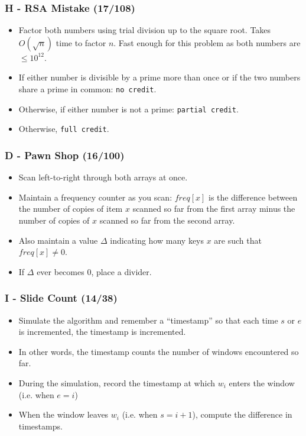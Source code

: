 \documentclass{beamer}
\begin{document}
\begin{frame}
\frametitle{H - RSA Mistake (17/108)}
\begin{itemize}
  \setlength\itemsep{0.5\baselineskip}
\item Factor both numbers using trial division up to the square root. Takes $O(\sqrt n)$ time to factor $n$. Fast enough for this problem as both numbers are $\leq 10^{12}$.
\item If either number is divisible by a prime more than once or if the two numbers share a prime in common: \texttt{no credit}.
\item Otherwise, if either number is not a prime: \texttt{partial credit}.
\item Otherwise, \texttt{full credit}.
\end{itemize}
\end{frame}



\begin{frame}
\frametitle{D - Pawn Shop (16/100)}
\begin{itemize}
  \setlength\itemsep{0.3\baselineskip}
  \item Scan left-to-right through both arrays at once.
  \item Maintain a frequency counter as you scan: $freq[x]$ is the difference between the number of copies of item $x$ scanned so far from the first array minus the number of copies of $x$ scanned so far from the second array.
  \item Also maintain a value $\Delta$ indicating how many keys $x$ are such that $freq[x] \neq 0$.
  \item If $\Delta$ ever becomes $0$, place a divider.
\end{itemize}
\end{frame}






\begin{frame}
\frametitle{I - Slide Count (14/38)}
\begin{itemize}
\setlength\itemsep{0.5\baselineskip}
\item Simulate the algorithm and remember a ``timestamp'' so that
  each time $s$ or $e$ is incremented, the timestamp is incremented.
\item In other words, the timestamp counts the number of windows encountered
  so far.
\item During the simulation, record the timestamp at which $w_i$
  enters the window (i.e. when $e = i$)
\item When the window leaves $w_i$ (i.e. when $s = i+1$), compute the
  difference in timestamps.
\end{itemize}
\end{frame}
\end{document}
